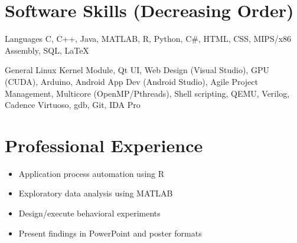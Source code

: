 \documentclass{tccv_AH}
\begin{document}
\vspace{-1.75em}
\section{Software Skills \footnotesize{(Decreasing Order)}}

\begin{factlist}

\item{Languages}
     {C, C++, Java, MATLAB, R, Python, C\#, HTML, CSS, MIPS/x86 Assembly, SQL, \LaTeX}

\item{General}
     {Linux Kernel Module, Qt UI, Web Design (Visual Studio), GPU (CUDA), Arduino, Android App Dev (Android Studio), 
     Agile Project Management, Multicore (OpenMP/Pthreads), Shell scripting, QEMU, Verilog, Cadence Virtuoso, gdb, Git, IDA Pro}

\end{factlist}


\vspace{-1.5em}
\section{Professional Experience}

\begin{itemize}
    \itemsep-0.25em
    \item{Application process automation using R}
\end{itemize}

\medskip


\medskip

\begin{itemize}
    \itemsep-0.25em
    \item{Exploratory data analysis using MATLAB}
    \item{Design/execute behavioral experiments}
    \item{Present findings in PowerPoint and poster formats}
\end{itemize}
\end{document}

